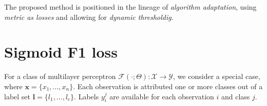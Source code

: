 \documentclass[sigconf,natbib,screen=true,review=true,anonymous]{acmart}
\begin{document}
The proposed method is positioned in the lineage of \emph{algorithm adaptation}, using \emph{metric as losses} and allowing for \emph{dynamic thresholdig}. 



















\section{Sigmoid F1 loss}
\label{sec:org42f3a7a}

For a class of multilayer perceptron \(\mathcal{F}(\cdot ; \Theta): \mathcal{X} \rightarrow \mathcal{Y}\), we consider a special case, where \(\mathbf{x} = \{x_1, ..., x_n\}\). Each observation is attributed one or more classes out of a label set \(\mathbf{l} = \{l_1, ..., l_c\}\). Labels \(y_{i}^{j}\) are available for each observation \(i\) and class \(j\). 
\end{document}
